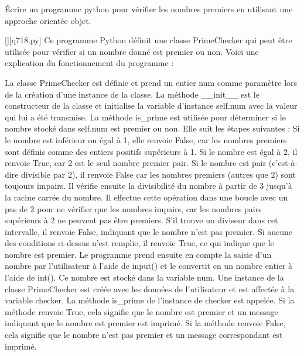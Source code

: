         \question
        Écrire un programme python pour vérifier les nombres premiers en utilisant une approche orientée objet.
        \par
        \begin{solution}
            \renewcommand{\nomfichier}{q718.py}
            \pythonfile{\chemincode \nomfichier}[][\nomfichier]
            Ce programme Python définit une classe PrimeChecker qui peut être utilisée pour vérifier si un nombre donné est premier ou non. Voici une explication du fonctionnement du programme :

    La classe PrimeChecker est définie et prend un entier num comme paramètre lors de la création d'une instance de la classe.
    La méthode __init__ est le constructeur de la classe et initialise la variable d'instance self.num avec la valeur qui lui a été transmise.
    La méthode is_prime est utilisée pour déterminer si le nombre stocké dans self.num est premier ou non. Elle suit les étapes suivantes :
        Si le nombre est inférieur ou égal à 1, elle renvoie False, car les nombres premiers sont définis comme des entiers positifs supérieurs à 1.
        Si le nombre est égal à 2, il renvoie True, car 2 est le seul nombre premier pair.
        Si le nombre est pair (c'est-à-dire divisible par 2), il renvoie False car les nombres premiers (autres que 2) sont toujours impairs.
        Il vérifie ensuite la divisibilité du nombre à partir de 3 jusqu'à la racine carrée du nombre. Il effectue cette opération dans une boucle avec un pas de 2 pour ne vérifier que les nombres impairs, car les nombres pairs supérieurs à 2 ne peuvent pas être premiers. S'il trouve un diviseur dans cet intervalle, il renvoie False, indiquant que le nombre n'est pas premier.
        Si aucune des conditions ci-dessus n'est remplie, il renvoie True, ce qui indique que le nombre est premier.
    Le programme prend ensuite en compte la saisie d'un nombre par l'utilisateur à l'aide de input() et le convertit en un nombre entier à l'aide de int(). Ce nombre est stocké dans la variable num.
    Une instance de la classe PrimeChecker est créée avec les données de l'utilisateur et est affectée à la variable checker.
    La méthode is_prime de l'instance de checker est appelée. Si la méthode renvoie True, cela signifie que le nombre est premier et un message indiquant que le nombre est premier est imprimé. Si la méthode renvoie False, cela signifie que le nombre n'est pas premier et un message correspondant est imprimé.
        \end{solution}
        

